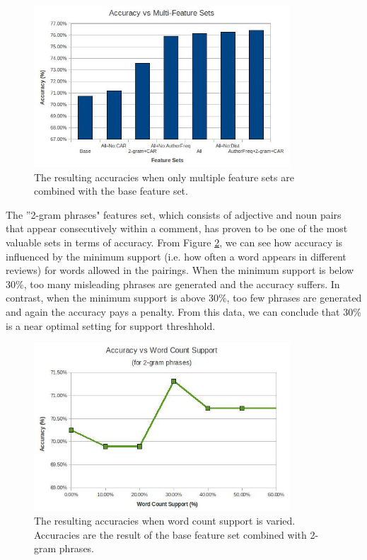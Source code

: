 \documentclass[]{report}
\begin{document}
\begin{figure}[H]
\centering
\includegraphics[width=3.77in]{AccuracyVsMultiFeatureSets.jpg}
\caption{The resulting accuracies when only multiple feature sets are combined with the base feature set.}
\label{fig:MultiFeatureSets}
\end{figure}

The ''2-gram phrases" features set, which consists of adjective and noun pairs that appear consecutively within a comment, has proven to be one of the most valuable sets in terms of accuracy.  From Figure \ref{fig:WordCountSupport}, we can see how accuracy is influenced by the minimum support (i.e. how often a word appears in different reviews) for words allowed in the pairings.  When the minimum support is below 30\%, too many misleading phrases are generated and the accuracy suffers.  In contrast, when the minimum support is above 30\%, too few phrases are generated and again the accuracy pays a penalty.  From this data, we can conclude that 30\% is a near optimal setting for support threshhold. 

\begin{figure}[H]
\centering
\includegraphics[width=3.77in]{AccuracyVsWordCountSupport.jpg}
\caption{The resulting accuracies when word count support is varied.  Accuracies are the result of the base feature set combined with 2-gram phrases.}
\label{fig:WordCountSupport}
\end{figure}
\end{document}
